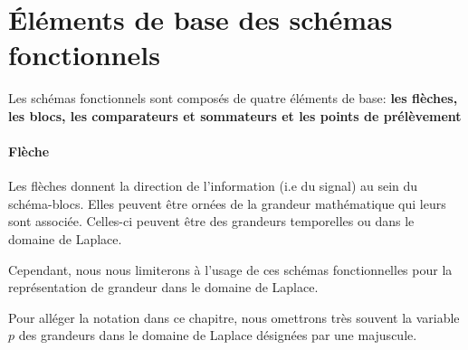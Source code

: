\section{\'Eléments de base des schémas fonctionnels}
Les schémas fonctionnels sont composés de quatre éléments de base:
\textbf{les flèches, les blocs, les comparateurs et sommateurs et les points 
de prélèvement}

\paragraph{Flèche}
Les flèches donnent la direction de l'information (i.e du signal) au sein du 
schéma-blocs. Elles peuvent être ornées de la grandeur mathématique qui leurs 
sont associée. 
Celles-ci peuvent être des grandeurs temporelles ou dans le domaine de Laplace. 
\begin{center}
\end{center}
Cependant, nous nous limiterons à l'usage de ces schémas fonctionnelles pour la 
représentation de grandeur dans le domaine de Laplace.

Pour alléger la notation dans ce chapitre, nous omettrons 
très souvent la variable $p$ des grandeurs dans le domaine de Laplace désignées 
par une majuscule.

